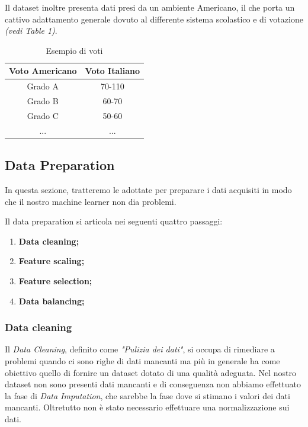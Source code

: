 \documentclass{article}
\begin{document}
Il dataset inoltre presenta dati presi da un ambiente Americano, il che porta un cattivo adattamento generale dovuto al differente sistema scolastico e di votazione \textit{(vedi Table 1)}.

\begin{table}[ht]
    \centering
    \begin{tabular}{|c|c|}
        \hline
        Voto Americano & Voto Italiano \\
        \hline
        Grado A        & 70-110        \\
        Grado B        & 60-70         \\
        Grado C        & 50-60         \\
        ...            & ...           \\
        \hline
    \end{tabular}
    \caption{Esempio di voti}
\end{table}

\newpage

\subsection{Data Preparation}
In questa sezione, tratteremo le adottate per preparare i dati acquisiti in modo che il nostro machine learner
non dia problemi.

Il data preparation si articola nei seguenti quattro passaggi:

\begin{enumerate}
    \item \textbf{Data cleaning;}
    \item \textbf{Feature scaling;}
    \item \textbf{Feature selection;}
    \item \textbf{Data balancing;}
\end{enumerate}

\subsubsection{Data cleaning}
Il \textit{Data Cleaning}, definito come \textit{"Pulizia dei dati"}, si occupa di rimediare a problemi quando ci sono righe
di dati mancanti ma più in generale ha come obiettivo quello di fornire un dataset dotato di una qualità adeguata.
Nel nostro dataset non sono presenti dati mancanti e di conseguenza non abbiamo effettuato la fase di \textit{Data Imputation}, che
sarebbe la fase dove si stimano i valori dei dati mancanti. Oltretutto non è stato necessario effettuare una normalizzazione
sui dati.
\end{document}
